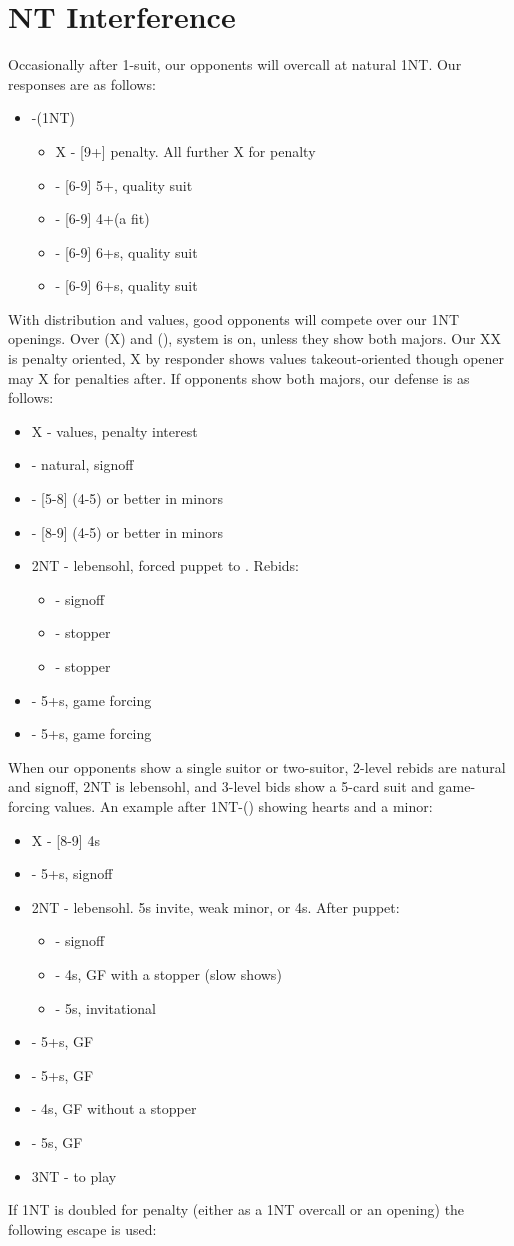\documentclass[12pt]{report}
\newcommand{\q}[1]{\multido{}{#1}{\qquad}}
\newcommand{\ul}[1]{\begin{itemize}#1\end{itemize}}
\newcommand{\li}[1]{\item[~] \q{#1}}
\begin{document}
\section{NT Interference} \label{3:4}

    Occasionally after 1-suit, our opponents will overcall at natural 1NT.  Our responses are as follows:

    \ul {
        \li0 -(1NT)
        \ul {
            \li0 X - [9+] penalty.  All further X for penalty
            \li0 \cl2 - [6-9] 5+\cl{}, quality suit
            \li0 \di2 - [6-9] 4+\di (a fit)
            \li0 \he2 - [6-9] 6+\he{}s, quality suit
            \li0 \sp2 - [6-9] 6+\sp{}s, quality suit
        }
    }

    With distribution and values, good opponents will compete over our 1NT openings.  Over (X) and (), system is on, unless they show both majors.  Our XX is penalty oriented, X by responder shows values takeout-oriented though opener may X for penalties after.  If opponents show both majors, our defense is as follows:

    \ul {
        \li0 X - values, penalty interest
        \li0 \di2 - natural, signoff
        \li0 \he2 - [5-8] (4-5) or better in minors
        \li0 \sp2 - [8-9] (4-5) or better in minors
        \li0 2NT - lebensohl, forced puppet to \cl3.  Rebids:
        \ul {
            \li0 \di3 - signoff
            \li0 \he3 - stopper
            \li0 \sp3 - stopper
        }
        \li0 \cl3 - 5+\cl{}s, game forcing
        \li0 \di3 - 5+\di{}s, game forcing
    }

    When our opponents show a single suitor or two-suitor, 2-level rebids are natural and signoff, 2NT is lebensohl, and 3-level bids show a 5-card suit and game-forcing values.  An example after 1NT-() showing hearts and a minor:

    \ul {
        \li0 X - [8-9] 4\sp{}s
        \li0  - 5+\sp{}s, signoff
        \li0 2NT - lebensohl.  5\sp{}s invite, weak minor, or 4\sp{}s.  After \cl3 puppet:
        \ul {
            \li0 \di3 - signoff
            \li0 \he3 - 4\sp{}s, GF with a stopper (slow shows)
            \li0 \sp3 - 5\sp{}s, invitational
        }

        \li0 \cl3 - 5+\cl{}s, GF
        \li0 \di3 - 5+\di{}s, GF
        \li0 \he3 - 4\sp{}s, GF without a stopper
        \li0 \sp3 - 5\sp{}s, GF
        \li0 3NT - to play
    }

    If 1NT is doubled for penalty (either as a 1NT overcall or an opening) the following escape is used:
\end{document}
